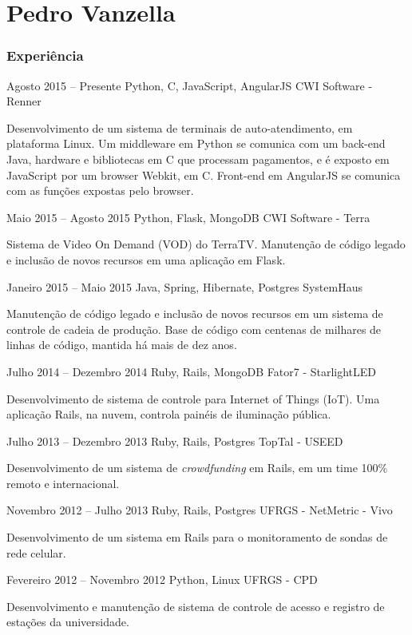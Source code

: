 \documentclass{tccv}
\begin{document}
\part{Pedro Vanzella}

\section{Experiência}

\begin{eventlist}

\item{Agosto 2015 -- Presente}
     {Python, C, JavaScript, AngularJS}
     {CWI Software - Renner}

Desenvolvimento de um sistema de terminais de auto-atendimento, em plataforma
Linux. Um middleware em Python se comunica com um back-end Java, hardware e
bibliotecas em C que processam pagamentos, e é exposto em JavaScript por um
browser Webkit, em C. Front-end em AngularJS se comunica com as funções expostas
pelo browser.

\item{Maio 2015 -- Agosto 2015}
     {Python, Flask, MongoDB}
     {CWI Software - Terra}

Sistema de Video On Demand (VOD) do TerraTV. Manutenção de código legado e inclusão
de novos recursos em uma aplicação em Flask.

\item{Janeiro 2015 -- Maio 2015}
     {Java, Spring, Hibernate, Postgres}
     {SystemHaus}

Manutenção de código legado e inclusão de novos recursos em um sistema de
controle de cadeia de produção. Base de código com centenas de milhares de
linhas de código, mantida há mais de dez anos.

\item{Julho 2014 -- Dezembro 2014}
     {Ruby, Rails, MongoDB}
     {Fator7 - StarlightLED}

Desenvolvimento de sistema de controle para Internet of Things (IoT). Uma
aplicação Rails, na nuvem, controla painéis de iluminação pública.

\item{Julho 2013 -- Dezembro 2013}
     {Ruby, Rails, Postgres}
     {TopTal - USEED}

Desenvolvimento de um sistema de \textit{crowdfunding} em Rails, em um time
100\% remoto e internacional.

\item{Novembro 2012 -- Julho 2013}
     {Ruby, Rails, Postgres}
     {UFRGS - NetMetric - Vivo}
 
Desenvolvimento de um sistema em Rails para o monitoramento de sondas de rede celular.

\item{Fevereiro 2012 -- Novembro 2012}
     {Python, Linux}
     {UFRGS - CPD}

Desenvolvimento e manutenção de sistema de controle de acesso e registro de
estações da universidade.

\end{eventlist}
\end{document}
